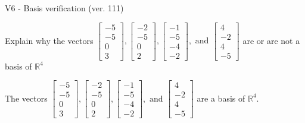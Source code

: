\begin{exercise}
  \begin{exerciseTitle}V6 - Basis verification (ver. 111)\end{exerciseTitle}
  \begin{exerciseStatement}
    Explain why the vectors \(\left[\begin{array}{r}
-5 \\
-5 \\
0 \\
3
\end{array}\right] , \left[\begin{array}{r}
-2 \\
-5 \\
0 \\
2
\end{array}\right] , \left[\begin{array}{r}
-1 \\
-5 \\
-4 \\
-2
\end{array}\right] , \text{ and } \left[\begin{array}{r}
4 \\
-2 \\
4 \\
-5
\end{array}\right]\) are or are not a basis of \(\mathbb{R}^4\)	


  \end{exerciseStatement}
  \begin{exerciseAnswer}
   The vectors \(\left[\begin{array}{r}
-5 \\
-5 \\
0 \\
3
\end{array}\right] , \left[\begin{array}{r}
-2 \\
-5 \\
0 \\
2
\end{array}\right] , \left[\begin{array}{r}
-1 \\
-5 \\
-4 \\
-2
\end{array}\right] , \text{ and } \left[\begin{array}{r}
4 \\
-2 \\
4 \\
-5
\end{array}\right]\) 
  	 are  a basis of \(\mathbb{R}^4\).
  


  \end{exerciseAnswer}
\end{exercise}